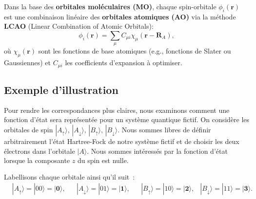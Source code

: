 \documentclass[12pt,a4paper]{article} %
\numberwithin{equation}{section} %
\numberwithin{figure}{section} %
\numberwithin{table}{section} %
\begin{document}
Dans la base des \textbf{orbitales moléculaires (MO)}, chaque spin-orbitale $\phi_i(\mathbf{r})$ est une combinaison linéaire des \textbf{orbitales atomiques (AO)} via la méthode \textbf{LCAO} (Linear Combination of Atomic Orbitals):
\begin{equation}
\phi_i(\mathbf{r}) = \sum_{\mu} C_{\mu i} \chi_\mu(\mathbf{r} - \mathbf{R}_A),
\end{equation}
où $\chi_{\mu}(\mathbf{r})$ sont les fonctions de base  atomiques (e.g., fonctions de Slater ou Gaussiennes) et $C_{\mu i}$ les coefficients d’expansion à optimiser.

\subsection{Exemple d'illustration}\label{exemple-dillustration}

Pour rendre les correspondances plus claires, nous examinons comment une fonction d'état sera représentée pour un système quantique fictif. On considère les orbitales de spin
$|A_\uparrow\rangle,\,|A_\downarrow\rangle,\,|B_\uparrow\rangle,\,|B_\downarrow\rangle$. Nous sommes libres de définir arbitrairement l'état Hartree-Fock de notre système fictif et de choisir les deux électrons dans l'orbitale $|A\rangle$. Nous sommes intéressés par la fonction d'état lorsque la composante $z$ du spin est nulle.

Labellisons chaque orbitale ainsi qu'il suit~:
\begin{align}
 &|A_\uparrow\rangle=|00\rangle=|\mathbf{0}\rangle,  &&|A_\downarrow\rangle=|01\rangle=|\mathbf{1}\rangle,
&&|B_\uparrow\rangle=|10\rangle=|\mathbf{2}\rangle,  &|B_\downarrow\rangle=|11\rangle=|\mathbf{3}\rangle.
\end{align}
\end{document}
